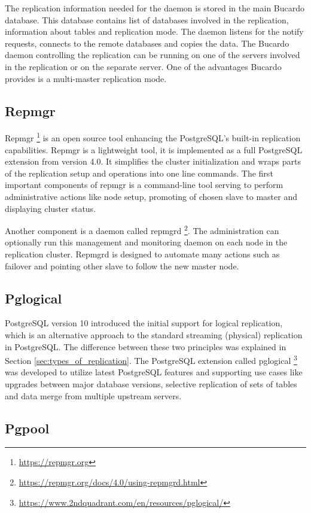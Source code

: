 \documentclass[
  digital, %
  twoside, %
  table,   %
  lof,     %
  lot,     %
]{fithesis3}
\begin{document}
The replication information needed for the daemon is stored in the main Bucardo database. This database contains list of databases involved in the replication, information about tables and replication mode. The daemon listens for the notify requests, connects to the remote databases and copies the data. The Bucardo daemon controlling the replication can be running on one of the servers involved in the replication or on the separate server. One of the advantages Bucardo provides is a multi-master replication mode.

\subsection{Repmgr} \label{sec:repmgr}
Repmgr \footnote{\url{https://repmgr.org}} is an open source tool enhancing the PostgreSQL's built-in replication capabilities. Repmgr is a lightweight tool, it is implemented as a full PostgreSQL extension from version 4.0. It simplifies the cluster initialization and wraps parts of the replication setup and operations into one line commands.
The first important components of repmgr is a command-line tool serving to perform administrative actions like node setup, promoting of chosen slave to master and displaying cluster status.

Another component is a daemon called repmgrd \footnote{\url{https://repmgr.org/docs/4.0/using-repmgrd.html}}. The administration can optionally run this management and monitoring daemon on each node in the replication cluster. Repmgrd is designed to automate many actions such as failover and pointing other slave to follow the new master node.

\subsection{Pglogical}
PostgreSQL version 10 introduced the initial support for logical replication, which is an alternative approach to the standard streaming (physical) replication in PostgreSQL. The difference between these two principles was explained in Section \ref{sec:types_of_replication}. The PostgreSQL extension called pglogical \footnote{\url{https://www.2ndquadrant.com/en/resources/pglogical/}} was developed to utilize latest PostgreSQL features and supporting use cases like upgrades between major database versions, selective replication of sets of tables and data merge from multiple upstream servers.

\subsection{Pgpool}
\end{document}
